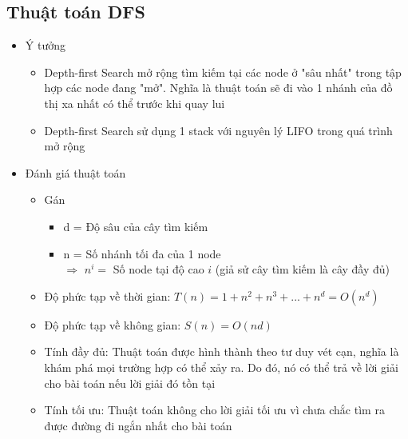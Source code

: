 \documentclass[a4paper, 12pt]{article}
\begin{document}
    \subsection{Thuật toán DFS}
    \begin{itemize}
        \item Ý tưởng
        \begin{itemize}
            \item Depth-first Search mở rộng tìm kiếm tại các node ở "sâu nhất" trong tập hợp các node đang "mở". Nghĩa là thuật toán sẽ đi vào 1 nhánh của đồ thị xa nhất có thể trước khi quay lui
            \item Depth-first Search sử dụng 1 stack với nguyên lý LIFO trong quá trình mở rộng
        \end{itemize}

        \item Đánh giá thuật toán
        \begin{itemize}
            \item Gán 
            \begin{itemize}
                \item d = Độ sâu của cây tìm kiếm
                \item n = Số nhánh tối đa của 1 node \\
                $\Rightarrow$ $n^i = $ Số node tại độ cao $i$ (giả sử cây tìm kiếm là cây đầy đủ)
            \end{itemize}
            \item Độ phức tạp về thời gian: $T(n) = 1 + n^{2} + n^{3} + ... + n^{d} = O(n^{d})$
            \item Độ phức tạp về không gian: $S(n) = O(nd)$
            \item Tính đầy đủ: Thuật toán được hình thành theo tư duy vét cạn, nghĩa là khám phá mọi trường hợp có thể xảy ra. Do đó, nó có thể trả về lời giải cho bài toán nếu lời giải đó tồn tại
            \item Tính tối ưu: Thuật toán không cho lời giải tối ưu vì chưa chắc tìm ra được đường đi ngắn nhất cho bài toán
        \end{itemize}
    \end{itemize}
\end{document}
